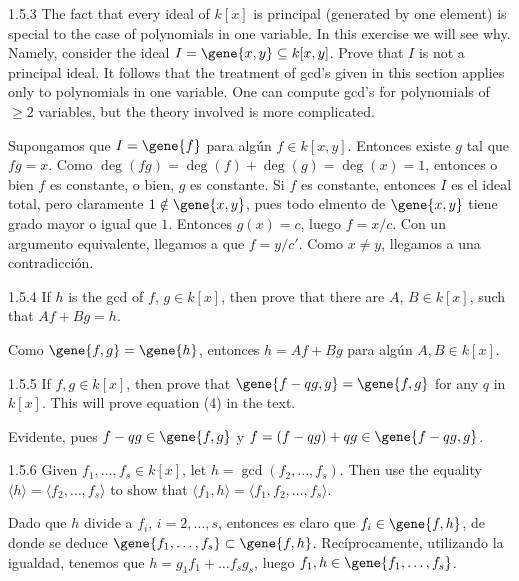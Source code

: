 \documentclass[twoside]{article}
\begin{document}
\begin{ejercicio}{1.5.3}
The fact that every ideal of $k[x]$ is principal (generated by one element) is special to the case of polynomials in one variable.
In this exercise we will see why.
Namely, consider the ideal $I=\gene{x,y} \subseteq k[x,y]$.
Prove that $I$ is not a principal ideal.
It follows that the treatment of gcd’s given in this section applies only to polynomials in one variable.
One can compute gcd’s for polynomials of $≥ 2$ variables, but the theory involved is more complicated.
\end{ejercicio}
\begin{solucion}
Supongamos que $I = \gene{f}$ para algún $f \in k[x,y]$.
Entonces existe $g$ tal que $fg = x$.
Como $\deg(fg) = \deg(f) + \deg(g) = \deg(x) = 1$, entonces o bien $f$ es constante, o bien, $g$ es constante.
Si $f$ es constante, entonces $I$ es el ideal total, pero claramente $1 \notin \gene{x,y}$, pues todo elmento de $\gene{x,y}$ tiene grado mayor o igual que $1$.
Entonces $g(x) = c$, luego $f = x/c$.
Con un argumento equivalente, llegamos a que $f = y/c'$.
Como $x \neq y$, llegamos a una contradicción.
\end{solucion}

\newpage

\begin{ejercicio}{1.5.4}
If $h$ is the gcd of $f$, $g \in k[x]$, then prove that there are $A$, $B \in k[x]$, such that $A f + B g = h$.
\end{ejercicio}
\begin{solucion}
Como $\gene{f,g} = \gene{h}$, entonces $h = A f + B g$ para algún $A, B \in k[x]$.
\end{solucion}

\newpage

\begin{ejercicio}{1.5.5}
If $f,g \in k[x]$, then prove that $\gene{f-qg,g} = \gene{f,g}$ for any $q$ in $k[x]$.
This will prove equation (4) in the text.
\end{ejercicio}
\begin{solucion}
Evidente, pues $f-qg \in \gene{f,g}$ y $f = (f-qg)+qg \in \gene{f-qg,g}$.
\end{solucion}

\newpage

\begin{ejercicio}{1.5.6}
Given $f_1,\dots , f_s ∈ k[x]$, let $h = \gcd( f_2,\dots , f_s)$. Then use the equality 
$\langle h\rangle = 
 \langle f_2,\dots , f_s\rangle$
to show that 
 $\langle f_1, h\rangle = 
 \langle f_1, f_2,\dots, f_s\rangle$.
\end{ejercicio}
\begin{solucion}
Dado que $h$ divide a $f_i$, $i=2,\dotsc,s$, entonces es claro que $f_i\in\gene{f,h}$, de donde se deduce $\gene{f_1,\dotsc,f_s}\subset \gene{f,h}$. Recíprocamente, utilizando la igualdad, tenemos que $h=g_1f_1+\dotsc f_sg_s$, luego $f_1,h\in\gene{f_1,\dotsc,f_s}$. 
\end{solucion}
\end{document}
